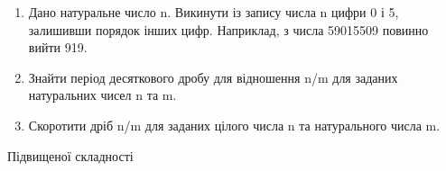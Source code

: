 \documentclass[]{article}
\makeatletter
\newcommand{\xslalph}[1]{\expandafter\@xslalph\csname c@#1\endcsname}
\newcommand{\@xslalph}[1]{%
    \ifcase#1\or а\or б\or в\or г\or д\or e\or є\or ж\or з\or i%
    \or й\or к\or л\or м\or н\or о\or п\or р\or с\or т%
    \or у\or ф\or х\or ц\or ч\or ш\or ю\or я\or аа\or бб\or вв%
    \else\@ctrerr\fi%
}
\makeatother
\begin{document}
\begin{enumerate}
\begin{enumerate}[label=\xslalph*)]

\item \(\max(\left| z_{1} \right|,\ldots,\left| z_{n} \right|),\) де
\(z_{i} = \left\{ \begin{matrix}
y_{i},\textup{ при }\left| y_{i} \right| \leq 2, \\
0.5,\textup{у інших випадках} \\
\end{matrix} \right.\ \);
\item \(\min(\left| z_{1} \right|,\ldots,\left| z_{n} \right|),\) де
\(z_{i} = \left\{ \begin{matrix}
 y_{i},\textup{при}\left| y_{i} \right| \geq 1, \\
 2,\textup{у інших випадках} \\
\end{matrix} \right.\ \);
\item \(z_{1} + z_{2} + \ldots + z_{n},\) де
\(z_{i} = \left\{ \begin{matrix}
 y_{i},\textup{при} {y}_{i} < 10, \\
 1,\textup{у інших випадках} \\
\end{matrix} \right.\ \)
 \end{enumerate}

\item
  Дано натуральне число n. Викинути із запису числа n цифри 0 і 5,
  залишивши порядок інших цифр. Наприклад, з числа 59015509 повинно
  вийти 919.
\item
  Знайти період десяткового дробу для відношення n/m для заданих
  натуральних чисел n та m.
\item
  Скоротити дріб n/m для заданих цілого числа n та натурального числа m.
\end{enumerate}

Підвищеної складності
\end{document}
